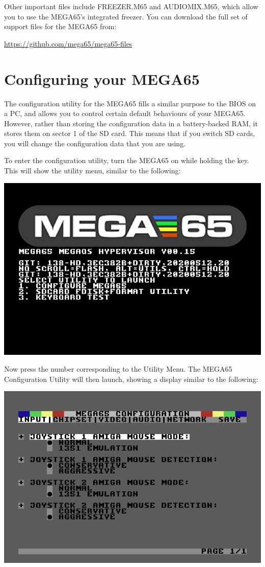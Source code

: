 Other important files include FREEZER.M65 and AUDIOMIX.M65, which
allow you to use the MEGA65's integrated freezer.  You can download
the full set of support files for the MEGA65 from:

\url{https://github.com/mega65/mega65-files}

\section{Configuring your MEGA65}

The configuration utility for the MEGA65 fills a similar purpose to the BIOS on a
PC, and allows you to control certain default behaviours of your
MEGA65. However, rather than storing the configuration data in a
battery-backed RAM, it stores them on sector 1 of the SD card. This means
that if you switch SD cards, you will change the configuration data that you are using.

To enter the configuration utility, turn the MEGA65 on while
holding the  key.  This will show the utility menu,
similar to the following:

\includegraphics[width=\linewidth]{images/ss-utilmenu.png}

Now press the number corresponding to the Utility Menu.  The MEGA65
Configuration Utility will then launch, showing a display similar to
the following:

\includegraphics[width=\linewidth]{images/ss-m65config-1.png}

